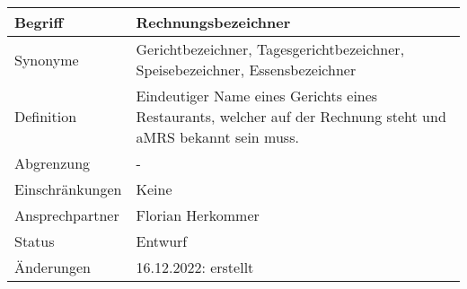 \begin{table}[H]
    \centering
    \label{gls:Gerichtbezeichner}
    \begin{tabularx}{\textwidth}{| l | X |}
        \hline
        Begriff         & Rechnungsbezeichner                                                                                                \\
        \hline
        Synonyme        & Gerichtbezeichner, Tagesgerichtbezeichner, Speisebezeichner, Essensbezeichner                                      \\
        \hline
        Definition      & Eindeutiger Name eines Gerichts eines Restaurants, welcher auf der Rechnung steht und \ac{aMRS} bekannt sein muss. \\
        \hline
        Abgrenzung      & -                                                                                                                  \\
        \hline
        Einschränkungen & Keine                                                                                                              \\
        \hline
        Ansprechpartner & Florian Herkommer                                                                                                  \\
        \hline
        Status          & Entwurf                                                                                                            \\
        \hline
        Änderungen      & 16.12.2022: erstellt                                                                                               \\
        \hline
    \end{tabularx}
\end{table}

